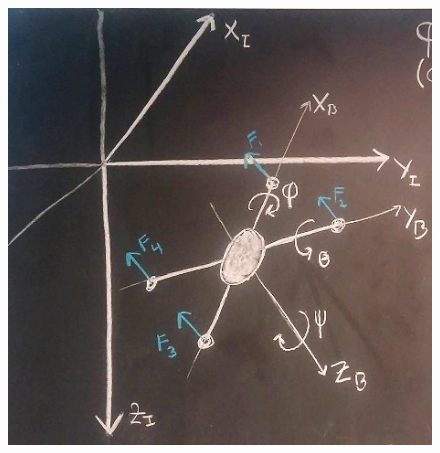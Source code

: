 \begin{minipage}{\linewidth}
	\begin{minipage}{0.45\linewidth}
		\begin{figure}[H]
			\includegraphics[scale=.27]{figures/drone_diagram}
			\centering
			

\end{figure}
\end{minipage}
\end{minipage}
